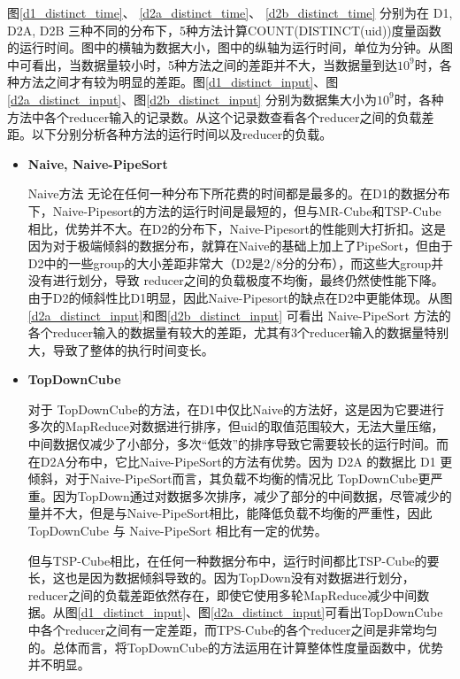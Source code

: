图\ref{d1_distinct_time}、 \ref{d2a_distinct_time}、 \ref{d2b_distinct_time} 分别为在 D1, D2A, D2B 三种不同的分布下，5种方法计算COUNT(DISTINCT(uid))度量函数的运行时间。图中的横轴为数据大小，图中的纵轴为运行时间，单位为分钟。从图中可看出，当数据量较小时，5种方法之间的差距并不大，当数据量到达${10}^{9}$时，各种方法之间才有较为明显的差距。图\ref{d1_distinct_input}、图\ref{d2a_distinct_input}、图\ref{d2b_distinct_input} 分别为数据集大小为${10}^{9}$时，各种方法中各个reducer输入的记录数。从这个记录数查看各个reducer之间的负载差距。以下分别分析各种方法的运行时间以及reducer的负载。

\begin{itemize}

\item \textbf{Naive, Naive-PipeSort}

Naive方法 无论在任何一种分布下所花费的时间都是最多的。在D1的数据分布下，Naive-Pipesort的方法的运行时间是最短的，但与MR-Cube和TSP-Cube相比，优势并不大。在D2的分布下，Naive-Pipesort的性能则大打折扣。这是因为对于极端倾斜的数据分布，就算在Naive的基础上加上了PipeSort，但由于D2中的一些group的大小差距非常大（D2是2/8分的分布），而这些大group并没有进行划分，导致 reducer之间的负载极度不均衡，最终仍然使性能下降。由于D2的倾斜性比D1明显，因此Naive-Pipesort的缺点在D2中更能体现。从图\ref{d2a_distinct_input}和图\ref{d2b_distinct_input} 可看出 Naive-PipeSort 方法的各个reducer输入的数据量有较大的差距，尤其有3个reducer输入的数据量特别大，导致了整体的执行时间变长。

\item \textbf{TopDownCube}

对于 TopDownCube的方法，在D1中仅比Naive的方法好，这是因为它要进行多次的MapReduce对数据进行排序，但uid的取值范围较大，无法大量压缩，中间数据仅减少了小部分，多次``低效”的排序导致它需要较长的运行时间。而在D2A分布中，它比Naive-PipeSort的方法有优势。因为 D2A 的数据比 D1 更倾斜，对于Naive-PipeSort而言，其负载不均衡的情况比 TopDownCube更严重。因为TopDown通过对数据多次排序，减少了部分的中间数据，尽管减少的量并不大，但是与Naive-PipeSort相比，能降低负载不均衡的严重性，因此TopDownCube 与 Naive-PipeSort 相比有一定的优势。

但与TSP-Cube相比，在任何一种数据分布中，运行时间都比TSP-Cube的要长，这也是因为数据倾斜导致的。因为TopDown没有对数据进行划分，reducer之间的负载差距依然存在，即使它使用多轮MapReduce减少中间数据。从图\ref{d1_distinct_input}、图\ref{d2a_distinct_input}可看出TopDownCube中各个reducer之间有一定差距，而TPS-Cube的各个reducer之间是非常均匀的。总体而言，将TopDownCube的方法运用在计算整体性度量函数中，优势并不明显。


\end{itemize}
